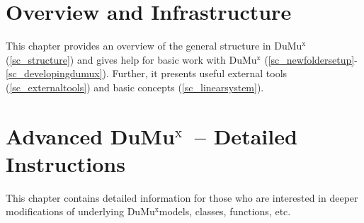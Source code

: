 \documentclass[11pt,a4paper,headinclude,footinclude,DIV16]{scrreprt}
\newcommand{\Dumux}{\texorpdfstring{Du\-Mu$^\text{x}$\xspace}{DuMuX\xspace}}
\begin{document}
\chapter{Overview and Infrastructure}
This chapter provides an overview of the general structure in \Dumux (\ref{sc_structure})
and gives help for basic work with \Dumux
(\ref{sc_newfoldersetup}-\ref{sc_developingdumux}).
Further, it presents useful external tools (\ref{sc_externaltools}) and basic
concepts (\ref{sc_linearsystem}).








\chapter{Advanced \Dumux\ -- Detailed Instructions}
This chapter contains detailed information for those who are interested
in deeper modifications of underlying \Dumux models, classes, functions, etc.










\end{document}
